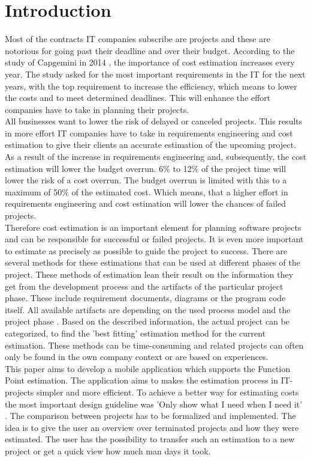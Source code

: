 \chapter{Introduction}

Most of the contracts IT companies subscribe are projects and these are notorious for going past their deadline and over their budget. According to the study of Capgemini in 2014 \cite{capgemini}, the importance of cost estimation increases every year. The study asked for the most important requirements in the IT for the next years, with the top requirement to increase the efficiency, which means to lower the costs and to meet determined deadlines. This will enhance the effort companies have to take in planning their projects.\\
All businesses want to lower the risk of delayed or canceled projects. This results in more effort IT companies have to take in requirements engineering and cost estimation to give their clients an accurate estimation of the upcoming project. As a result of the increase in requirements engineering and, subsequently, the cost estimation will lower the budget overrun. 6\% to 12\% of the project time will lower the risk of a cost overrun. The budget overrun is limited with this to a maximum of 50\% of the estimated cost\cite{Partsch}. Which means, that a higher effort in requirements engineering and cost estimation will lower the chances of failed projects.\\
Therefore cost estimation is an important element for planning software projects and can be responsible for successful or failed projects. It is even more important to estimate as precisely as possible to guide the project to success. There are several methods for these estimations that can be used at different phases of the project. These methods of estimation lean their result on the information they get from the development process and the artifacts of the particular project phase. These include requirement documents, diagrams or the program code itself. All available artifacts are depending on the used process model and the project phase \cite{EntwicklungKompakt}. Based on the described information, the actual project can be categorized, to find the 'best fitting' estimation method for the current estimation. These methods can be time-consuming and related projects can often only be found in the own company context or are based on experiences.\\
This paper aims to develop a mobile application which supports the Function Point estimation. The application aims to makes the estimation process in IT-projects simpler and more efficient. To achieve a better way for estimating costs the most important design guideline was 'Only show what I need when I need it' \cite{materialdesign}. The comparison between projects has to be formalized and implemented. The idea is to give the user an overview over terminated projects and how they were estimated. The user has the possibility to transfer such an estimation to a new project or get a quick view how much man days it took.\\
